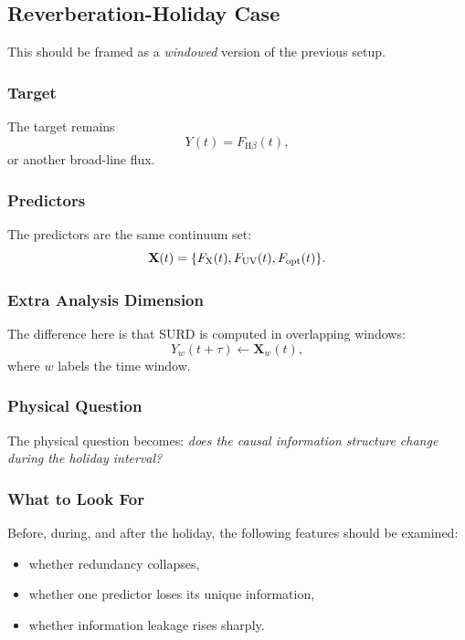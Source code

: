 \documentclass{article}
\begin{document}
\subsection{Reverberation-Holiday Case}

This should be framed as a \emph{windowed} version of the previous setup.

\subsubsection{Target}

The target remains
\[
Y(t)=F_{\mathrm{H}\beta}(t),
\]
or another broad-line flux.

\subsubsection{Predictors}

The predictors are the same continuum set:
\[
\mathbf{X}(t)=\{F_{\rm X}(t),F_{\rm UV}(t),F_{\rm opt}(t)\}.
\]

\subsubsection{Extra Analysis Dimension}

The difference here is that SURD is computed in overlapping windows:
\[
Y_w(t+\tau)\leftarrow \mathbf{X}_w(t),
\]
where \(w\) labels the time window.

\subsubsection{Physical Question}

The physical question becomes: \emph{does the causal information structure change during the holiday interval?}

\subsubsection{What to Look For}

Before, during, and after the holiday, the following features should be examined:
\begin{itemize}
    \item whether redundancy collapses,
    \item whether one predictor loses its unique information,
    \item whether information leakage rises sharply.
\end{itemize}
\end{document}
